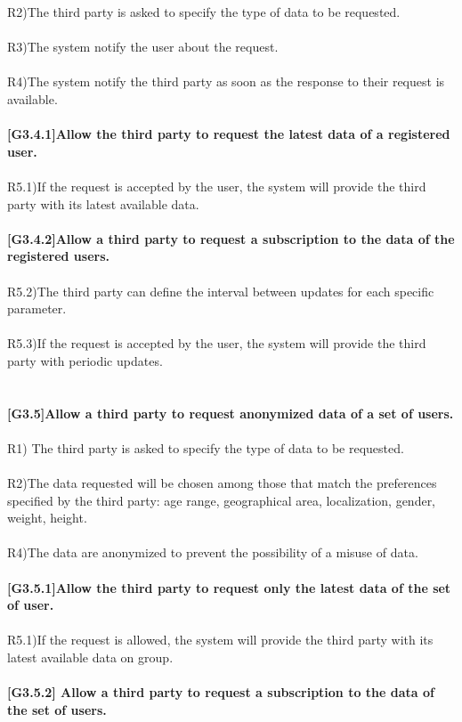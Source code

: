 R2)The third party is asked to specify the type of data to be requested.\\ \\ 
R3)The system notify the user about the request.\\ \\
R4)The system notify the third party as soon as the response to their request is available. \\ \\
\textbf{[G3.4.1]Allow the third party to request the latest data of a registered user.} \\ \\
R5.1)If the request is accepted by the user, the system will provide the third party with its latest available data. \\ \\ 
\textbf{[G3.4.2]Allow a third party to request a subscription to the data of the registered users.} \\ \\
R5.2)The third party can define the interval between updates for each specific parameter. \\ \\
R5.3)If the request is accepted by the user, the system will provide the third party with periodic updates. \\ \\ \\
\textbf{[G3.5]Allow a third party to request anonymized data of a set of users.} \\ \\
R1) The third party is asked to specify the type of data to be requested. \\ \\
 R2)The data requested will be chosen among those that match the preferences specified by the third party: age range, geographical area, localization, gender, weight, height. \\ \\
R4)The data are anonymized to prevent the possibility of a misuse of data. \\ \\ 
\textbf{[G3.5.1]Allow the third party to request only the latest data of the set of user.} \\ \\
R5.1)If the request is allowed, the system will provide the third party with its latest available data on group. \\ \\
\textbf{[G3.5.2] Allow a third party to request a subscription to the data of the set of users.} \\ \\
